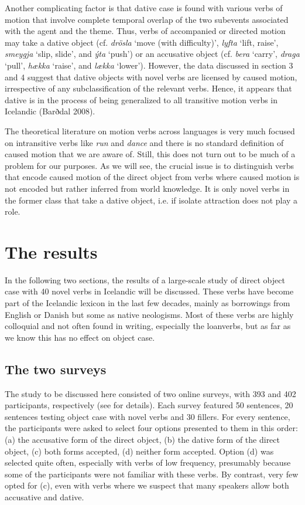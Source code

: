 \documentclass[output=paper,modfonts,nonflat,colorlinks,citecolor=brown]{langsci/langscibook}
\begin{document}
Another complicating factor is that dative case is found with various verbs of motion that involve complete temporal overlap of the two subevents associated with the agent and the theme. Thus, verbs of accompanied or directed motion may take a dative object (cf. \textit{drösla} ‘move (with difficulty)’, \textit{lyfta} ‘lift, raise’, \textit{smeygja} ‘slip, slide’, and \textit{ýta} ‘push’) or an accusative object (cf. \textit{bera} ‘carry’, \textit{draga} ‘pull’, \textit{hækka} ‘raise’, and \textit{lækka} ‘lower’). However, the data discussed in section 3 and 4 suggest that dative objects with novel verbs are licensed by caused motion, irrespective of any subclassification of the relevant verbs. Hence, it appears that dative is in the process of being generalized to all transitive motion verbs in Icelandic (Barðdal 2008).

The theoretical literature on motion verbs across languages is very much focused on intransitive verbs like \textit{run} and \textit{dance} and there is no standard definition of caused motion that we are aware of. Still, this does not turn out to be much of a problem for our purposes. As we will see, the crucial issue is to distinguish verbs that encode caused motion of the direct object from verbs where caused motion is not encoded but rather inferred from world knowledge. It is only novel verbs in the former class that take a dative object, i.e. if isolate attraction does not play a role.

\section{The results} %

In the following two sections, the results of a large-scale study of direct object case with 40 novel verbs in Icelandic will be discussed. These verbs have become part of the Icelandic lexicon in the last few decades, mainly as borrowings from English or Danish but some as native neologisms. Most of these verbs are highly colloquial and not often found in writing, especially the loanverbs, but as far as we know this has no effect on object case. 

\subsection{The two surveys} %

The study to be discussed here consisted of two online surveys, with 393 and 402 participants, respectively (see \citealt{Thórarinsdóttir2015} for details). Each survey featured 50 sentences, 20 sentences testing object case with novel verbs and 30 fillers. For every sentence, the participants were asked to select four options presented to them in this order: (a) the accusative form of the direct object, (b) the dative form of the direct object, (c) both forms accepted, (d) neither form accepted. Option (d) was selected quite often, especially with verbs of low frequency, presumably because some of the participants were not familiar with these verbs. By contrast, very few opted for (c), even with verbs where we suspect that many speakers allow both accusative and dative.
\end{document}
